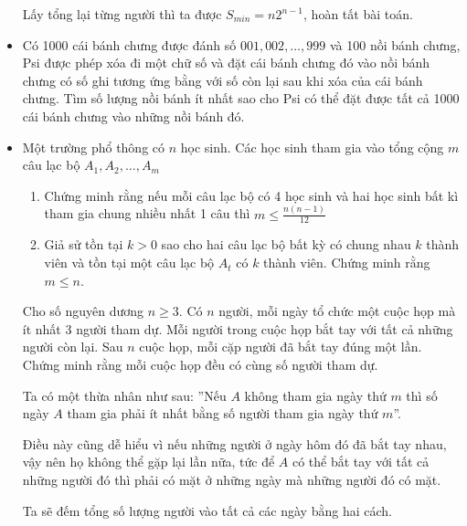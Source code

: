 \documentclass[11pt]{scrartcl}
\begin{document}
\begin{itemize}[label=, leftmargin=0em, itemsep=0.5em]
\begin{sol}
        Lấy tổng lại từng người thì ta được $S_{min} = n2^{n - 1}$, hoàn tất bài toán.\end{sol}
    \item \begin{btvn} Có 1000 cái bánh chưng được đánh số $001,002,\dots,999$ và 100 nồi bánh chưng, Psi được phép xóa đi một chữ số và đặt cái bánh chưng đó vào nồi bánh chưng có số ghi tương ứng bằng với số còn lại sau khi xóa của cái bánh chưng. Tìm số lượng nồi bánh ít nhất sao cho Psi có thể đặt được tất cả 1000 cái bánh chưng vào những nồi bánh đó.        
    \end{btvn}
    \item \begin{btvn}
        Một trường phổ thông có $n$ học sinh. Các học sinh tham gia vào tổng cộng $m$ câu lạc bộ $A_1,A_2,\dots,A_m$
        \begin{enumerate}[label=(\alph*)]
            \item Chứng minh rằng nếu mỗi câu lạc bộ có 4 học sinh và hai học sinh bất kì tham gia chung nhiều nhất 1 câu thì $m \leq \frac{n(n - 1)}{12}$
            \item Giả sử tồn tại $k > 0$ sao cho hai câu lạc bộ bất kỳ có chung nhau $k$ thành viên và tồn tại một câu lạc bộ $A_t$ có $k$ thành viên. Chứng minh rằng $m \leq n$.
        \end{enumerate}
    \end{btvn}
    \begin{bt}
        Cho số nguyên dương $n \geq 3$. Có $n$ người, mỗi ngày tổ chức một cuộc họp mà ít nhất 3 người tham dự. Mỗi người trong cuộc họp bắt tay với tất cả những người còn lại. Sau $n$ cuộc họp, mỗi cặp người đã bắt tay đúng một lần. Chứng minh rằng mỗi cuộc họp đều có cùng số người tham dự.
    \end{bt}
    \begin{sol}
        Ta có một thừa nhân như sau: ''Nếu $A$ không tham gia ngày thứ $m$ thì số ngày $A$ tham gia phải ít nhất bằng số người tham gia ngày thứ $m$''. 
        
        
        Điều này cũng dễ hiểu vì nếu những người ở ngày hôm đó đã bắt tay nhau, vậy nên họ không thể gặp lại lần nữa, tức để $A$ có thể bắt tay với tất cả những người đó thì phải có mặt ở những ngày mà những người đó có mặt.


        Ta sẽ đếm tổng số lượng người vào tất cả các ngày bằng hai cách.


\end{sol}
\end{itemize}
\end{document}
